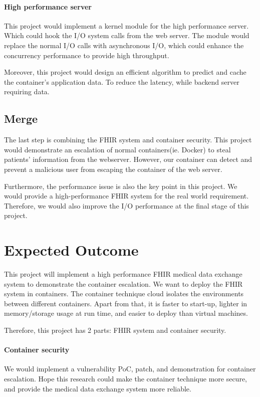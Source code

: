 \documentclass[12pt,a4paper]{article}
\begin{document}
\paragraph{High performance server}
This project would implement a kernel module for the high performance server. Which could hook the I/O
system calls from the web server. The module would replace the normal I/O calls with asynchronous I/O,
which could enhance the concurrency performance to provide high throughput.

Moreover, this project would design an efficient algorithm to predict and cache the container's
application data. To reduce the latency, while backend server requiring data.

\subsection{Merge}
The last step is combining the FHIR system and container security. This project would demonstrate
an escalation of normal containers(ie. Docker) to steal patients' information from the webserver.
However, our container can detect and prevent a malicious user from escaping the container of the
web server.

Furthermore, the performance issue is also the key point in this project. We would provide a
high-performance FHIR system for the real world requirement. Therefore, we would also improve the
I/O performance at the final stage of this project.


\section{Expected Outcome}
This project will implement a high performance FHIR medical data exchange system to demonstrate
the container escalation. We want to deploy the FHIR system in containers. The container technique
cloud isolates the environments between different containers. Apart from that, it is faster to start-up,
lighter in memory/storage usage at run time, and easier to deploy than virtual machines.

Therefore, this project has 2 parts: FHIR system and container security.
\paragraph{Container security}
We would implement a vulnerability PoC, patch, and demonstration for container escalation.
Hope this research could make the container technique more secure, and provide the medical
data exchange system more reliable.
\end{document}
